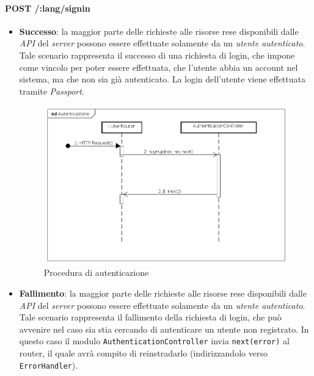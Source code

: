 \paragraph{POST /:lang/signin}
\begin{itemize}
\item \textbf{Successo}: la maggior parte delle richieste alle risorse rese disponibili dalle \textit{API} del \textit{server} possono essere effettuate solamente da un \textit{utente autenticato}. Tale scenario rappresenta il successo di una richiesta di login, che impone come vincolo per poter essere effettuata, che l'utente abbia un account nel sistema, ma che non sia già autenticato. La login dell'utente viene effettuata tramite \textit{Passport}.

\label{Procedura di autenticazione}
\begin{figure}[ht]
	\centering
	\includegraphics[scale=0.40]{UML/DiagrammiDiSequenza/Back-end/POST__lang_signin_success.png}
	\caption{Procedura di autenticazione}
\end{figure}
\FloatBarrier
 
\item \textbf{Fallimento}: la maggior parte delle richieste alle risorse rese disponibili dalle \textit{API} del \textit{server} possono essere effettuate solamente da un \textit{utente autenticato}. Tale scenario rappresenta il fallimento della richiesta di login, che può avvenire nel caso sia stia cercando di autenticare un utente non registrato. In questo caso il modulo \texttt{AuthenticationController} invia \texttt{next(error)} al router, il quale avrà compito di reinstradarlo (indirizzandolo verso \texttt{ErrorHandler}).


\end{itemize}
